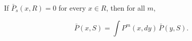 If $\bar{P}_s(x, R) = 0$ for every $x \in R$, then for all $m$,

$$\bar{P}(x, S) = \int P^m(x, dy) \, \bar{P}(y, S).$$
